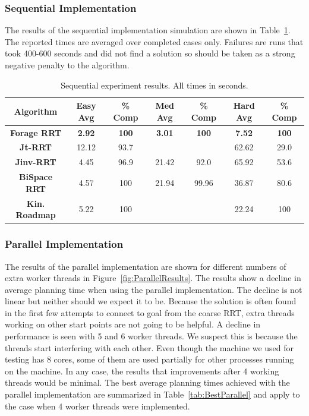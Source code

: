 \documentclass[conference]{IEEEtran}
\begin{document}
\subsubsection{Sequential Implementation}
The results of the sequential implementation simulation are shown in Table~\ref{tab:Results}. The reported times are averaged over completed
cases only. Failures are runs that took 400-600 seconds and did not find a solution so should be taken as a strong negative penalty to the
algorithm.

\begin{table}
        \centering
        \begin{tabular}{| c | c | c | c | c | c | c | }
		\hline
                Algorithm & \textbf{Easy Avg} & \textbf{\% Comp} &\textbf{Med Avg} & \textbf{\% Comp} & \textbf{Hard Avg} & \textbf{\% Comp}\\  \hline
                \textbf{Forage RRT}&\textbf{2.92}&\textbf{100}&\textbf{3.01}&\textbf{100}&\textbf{7.52}&\textbf{100}\\ \hline
                \textbf{Jt-RRT}&12.12&93.7& & &62.62&29.0\\ \hline
                \textbf{Jinv-RRT}&4.45&96.9&21.42&92.0&65.92&53.6\\ \hline
		\textbf{BiSpace RRT}&4.57&100&21.94&99.96&36.87&80.6\\ \hline
   		\textbf{Kin. Roadmap}&5.22&100& & &22.24&100\\ \hline
        \end{tabular}
        \caption{Sequential experiment results. All times in seconds.}
        \label{tab:Results}
\end{table}

\subsubsection{Parallel Implementation}
The results of the parallel implementation are shown for different numbers of extra worker threads in Figure~\ref{fig:ParallelResults}. The
results show a decline in average planning time when using the parallel implementation. The decline is not linear but neither should we
expect it to be. Because the solution is often found in the first few attempts to connect to goal from the coarse RRT, extra threads working
on other start points are not going to be helpful. A decline in performance is seen with 5 and 6 worker threads. We suspect this is because
the threads start interfering with each other. Even though the machine we used for testing has 8 cores, some of them are used partially for
other processes running on the machine. In any case, the results that improvements after 4 working threads would be minimal. The best
average planning times achieved with the parallel implementation are summarized in Table~\ref{tab:BestParallel} and apply to the case when 4
worker threads were implemented.
\end{document}
